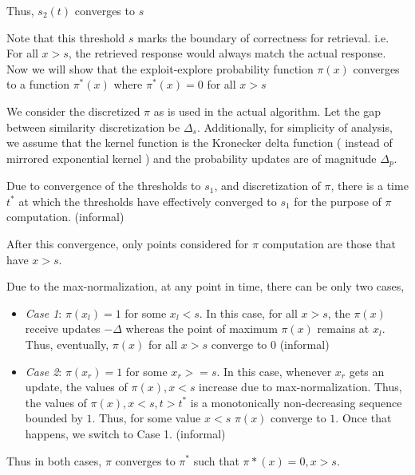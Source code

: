 Thus, $s_2(t)$ converges to $s$

Note that this threshold $s$ marks the boundary of correctness for retrieval. i.e. For all $x > s$, the retrieved response would always match the actual response. Now we will show that the exploit-explore probability function $\pi(x)$ converges to a function $\pi^*(x)$ where $\pi^*(x) = 0$ for all $x > s$

We consider the discretized $\pi$ as is used in the actual algorithm. Let the gap between similarity discretization be $\Delta_s$. Additionally, for simplicity of analysis, we assume that the kernel function is the Kronecker delta function ( instead of mirrored exponential kernel ) and the probability updates are of magnitude $\Delta_p$. 

Due to convergence of the thresholds to $s_1$, and discretization of $\pi$, there is a time $t^*$ at which the thresholds have effectively converged to $s_1$ for the purpose of $\pi$ computation. (informal)

After this convergence, only points considered for $\pi$ computation are those that have $x > s$.  

Due to the max-normalization, at any point in time, there can be only two cases, 

\begin{itemize}
    \item \textit{Case 1}: $\pi(x_l) =1$ for some $x_l < s$. In this case,  for all $x > s$, the $\pi(x)$ receive updates $-\Delta$ whereas the point of maximum $\pi(x)$ remains at $x_l$. Thus, eventually, $\pi(x)$ for all $x > s$ converge to $0$ (informal)
    
    \item \textit{Case 2}: $\pi(x_r) =1$ for some $x_r >= s$. In this case, whenever $x_r$ gets an update, the values of $\pi(x), x < s$ increase due to max-normalization. Thus, the values of $\pi(x), x < s, t > t^*$ is a monotonically non-decreasing sequence bounded by $1$. Thus, for some value $x < s$ $\pi(x)$  converge to $1$. Once that happens, we switch to Case 1. (informal)
\end{itemize}
Thus in both cases, $\pi$ converges to $\pi^*$ such that $\pi*(x) = 0, x > s$. 


